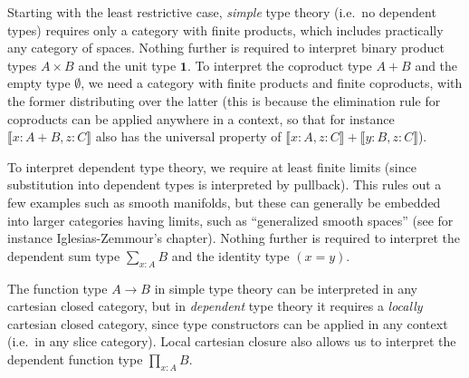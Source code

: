 \documentclass[10pt]{article}
\def\ty{\;\mathsf{type}}
\def\m#1{\llbracket#1\rrbracket}
\def\types{\vdash}
\def\unit{\mathbf{1}}
\numberwithin{equation}{section}
\begin{document}
Starting with the least restrictive case, \emph{simple} type theory (i.e.\ no dependent types) requires only a category with finite products, which includes  %
practically any category of spaces. %
Nothing further is required to interpret binary product types $A\times B$ and the unit type $\unit$.
To interpret the coproduct type $A+B$ and the empty type $\emptyset$, we need a category with finite products and finite coproducts, with the former distributing over the latter (this is because the elimination rule for coproducts can be applied anywhere in a context, so that for instance $\m{x:A+B, z:C}$ also has the universal property of $\m{x:A,z:C} + \m{y:B,z:C}$).

To interpret %
dependent type theory, we require at least finite limits (since substitution into dependent types is interpreted by pullback).
This rules out a few examples such as smooth manifolds, but these can generally be embedded into larger categories having limits, such as ``generalized smooth spaces'' (see for instance Iglesias-Zemmour's chapter).
Nothing further is required to interpret the dependent sum type $\sum_{x:A} B$ and the identity type $(x=y)$.

The function type $A\to B$ in simple type theory can be interpreted in any cartesian closed category, but in \emph{dependent} type theory it requires a \emph{locally} cartesian closed category, since type constructors can be applied in any context (i.e.\ in any slice category). %
Local cartesian closure also allows us to interpret the dependent function type $\prod_{x:A} B$.
\end{document}
